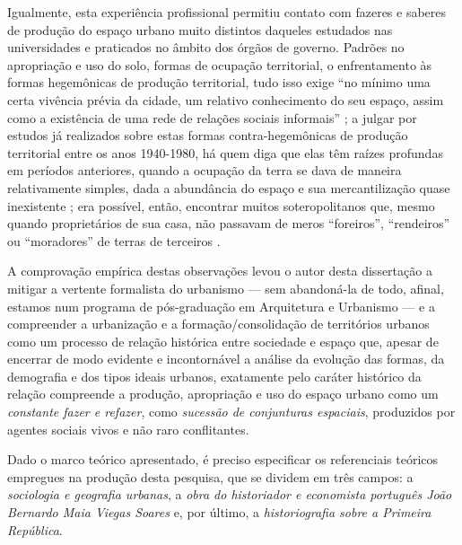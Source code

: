 Igualmente, esta experiência profissional permitiu contato com fazeres e saberes de produção do espaço urbano muito distintos daqueles estudados nas universidades e praticados no âmbito dos órgãos de governo. Padrões no apropriação e uso do solo, formas de ocupação territorial, o enfrentamento às formas hegemônicas de produção territorial, tudo isso exige ``no mínimo uma certa vivência prévia da cidade, um relativo conhecimento do seu espaço, assim como a existência de uma rede de relações sociais informais'' \cite[p.~40]{MATTEDI1981}; a julgar por estudos já realizados sobre estas formas contra-hegemônicas de produção territorial entre os anos 1940-1980, há quem diga que elas têm raízes profundas em períodos anteriores, quando a ocupação da terra se dava de maneira relativamente simples, dada a abundância do espaço e sua mercantilização quase inexistente \cite[p.~25]{MOURA1990}; era possível, então, encontrar muitos soteropolitanos que, mesmo quando proprietários de sua casa, não passavam de meros ``foreiros'', ``rendeiros'' ou ``moradores'' de terras de terceiros \cite[p.~139]{BRANDAO1980}.

A comprovação empírica destas observações levou o autor desta dissertação a mitigar a vertente formalista do urbanismo --- sem abandoná-la de todo, afinal, estamos num programa de pós-graduação em Arquitetura e Urbanismo --- e a compreender a urbanização e a formação/consolidação de territórios urbanos como um processo de relação histórica entre sociedade e espaço \cite{CASTELLS2000, SANTOS2008} que, apesar de encerrar de modo evidente e incontornável a análise da evolução das formas, da demografia e dos tipos ideais urbanos, exatamente pelo caráter histórico da relação compreende a produção, apropriação e uso do espaço urbano como um \textit{constante fazer e refazer}, como \textit{sucessão de conjunturas espaciais}, produzidos por agentes sociais vivos e não raro conflitantes.


Dado o marco teórico apresentado, é preciso especificar os referenciais teóricos empregues na produção desta pesquisa, que se dividem em três campos: a \textit{sociologia e geografia urbanas}, a \textit{obra do historiador e economista português João Bernardo Maia Viegas Soares} e, por último, a \textit{historiografia sobre a Primeira República}.

